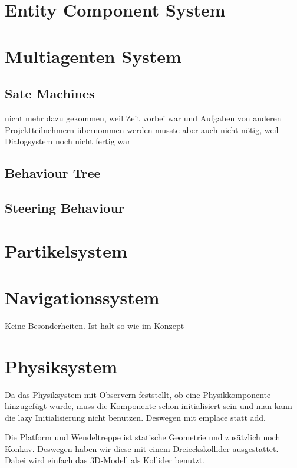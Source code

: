 
\section{Entity Component System}

\section{Multiagenten System}

\subsection{Sate Machines}

nicht mehr dazu gekommen, weil Zeit vorbei war und Aufgaben von anderen Projektteilnehmern übernommen werden musste
aber auch nicht nötig, weil Dialogsystem noch nicht fertig war

\subsection{Behaviour Tree}

\subsection{Steering Behaviour}

\section{Partikelsystem}

\section{Navigationssystem}

Keine Besonderheiten. Ist halt so wie im Konzept

\section{Physiksystem}

Da das Physiksystem mit Observern feststellt, ob eine Physikkomponente hinzugefügt wurde, muss die Komponente schon initialisiert sein und man kann die lazy Initialisierung nicht benutzen. Deswegen mit emplace statt add.

Die Platform und Wendeltreppe ist statische Geometrie und zusätzlich noch Konkav. Deswegen haben wir diese mit einem Dreieckskollider ausgestattet. Dabei wird einfach das 3D-Modell als Kollider benutzt.

